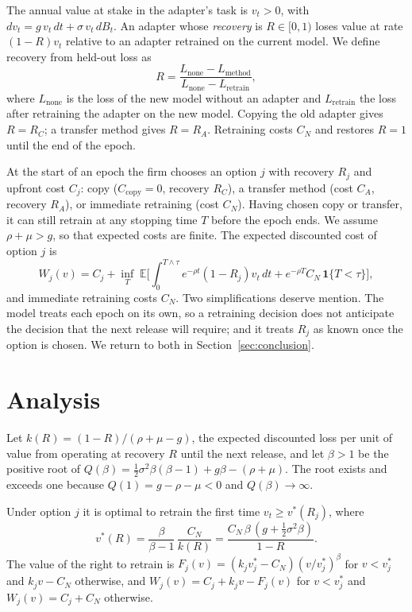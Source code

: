 \documentclass[ijds,nonblindrev]{informs4}
\newcommand{\E}{\mathbb{E}}
\begin{document}
The annual value at stake in the adapter's task is $v_t>0$, with $dv_t=g\,v_t\,dt+\sigma\,v_t\,dB_t$. An adapter whose \emph{recovery} is $R\in[0,1)$ loses value at rate $(1-R)v_t$ relative to an adapter retrained on the current model. We define recovery from held-out loss as
\begin{equation}\label{eq:recovery}
R=\frac{L_{\text{none}}-L_{\text{method}}}{L_{\text{none}}-L_{\text{retrain}}},
\end{equation}
where $L_{\text{none}}$ is the loss of the new model without an adapter and $L_{\text{retrain}}$ the loss after retraining the adapter on the new model. Copying the old adapter gives $R=R_C$; a transfer method gives $R=R_A$. Retraining costs $C_N$ and restores $R=1$ until the end of the epoch.

At the start of an epoch the firm chooses an option $j$ with recovery $R_j$ and upfront cost $C_j$: copy ($C_{\text{copy}}=0$, recovery $R_C$), a transfer method (cost $C_A$, recovery $R_A$), or immediate retraining (cost $C_N$). Having chosen copy or transfer, it can still retrain at any stopping time $T$ before the epoch ends. We assume $\rho+\mu>g$, so that expected costs are finite. The expected discounted cost of option $j$ is
\begin{equation}\label{eq:W}
W_j(v)=C_j+\inf_{T}\;\E\Big[\int_0^{T\wedge\tau}e^{-\rho t}(1-R_j)v_t\,dt+e^{-\rho T}C_N\,\mathbf 1\{T<\tau\}\Big],
\end{equation}
and immediate retraining costs $C_N$. Two simplifications deserve mention. The model treats each epoch on its own, so a retraining decision does not anticipate the decision that the next release will require; and it treats $R_j$ as known once the option is chosen. We return to both in Section~\ref{sec:conclusion}.

\section{Analysis}\label{sec:analysis}

Let $k(R)=(1-R)/(\rho+\mu-g)$, the expected discounted loss per unit of value from operating at recovery $R$ until the next release, and let $\beta>1$ be the positive root of $Q(\beta)=\tfrac12\sigma^2\beta(\beta-1)+g\beta-(\rho+\mu)$. The root exists and exceeds one because $Q(1)=g-\rho-\mu<0$ and $Q(\beta)\to\infty$.

\begin{proposition}\label{prop:thr}
Under option $j$ it is optimal to retrain the first time $v_t\ge v^*(R_j)$, where
\begin{equation}\label{eq:vstar}
v^*(R)=\frac{\beta}{\beta-1}\,\frac{C_N}{k(R)}=\frac{C_N\,\beta\,(g+\tfrac12\sigma^2\beta)}{1-R}.
\end{equation}
The value of the right to retrain is $F_j(v)=(k_jv^*_j-C_N)(v/v^*_j)^\beta$ for $v<v^*_j$ and $k_jv-C_N$ otherwise, and $W_j(v)=C_j+k_jv-F_j(v)$ for $v<v^*_j$ and $W_j(v)=C_j+C_N$ otherwise.
\end{proposition}
\end{document}
